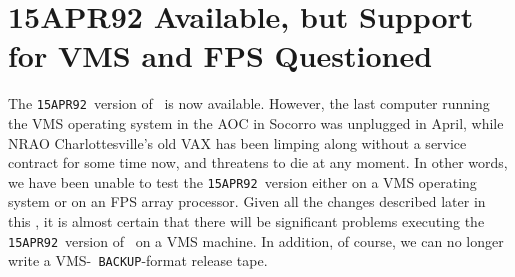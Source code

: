 

\newcommand{\AIPRELEASE}{April 15, 1992}
\newcommand{\AIPVOLUME}{Volume X}
\newcommand{\AIPNUMBER}{Number 1}
\newcommand{\RELEASENAME}{{\tt 15APR92}}



\newcommand{\MYSpace}{-11pt}

\normalstyle
\section{15APR92 Available, but Support for VMS and FPS Questioned}
The \RELEASENAME\ version of \AIPS\ is now available.  However, the
last computer running the VMS operating system in the AOC in Socorro
was unplugged in April, while  NRAO Charlottesville's old VAX has been
limping along without a service contract for some time now, and
threatens to die at any moment.  In other words, we have been unable
to test the \RELEASENAME\ version either on a VMS operating system or
on an FPS array processor.  Given all the changes described later in
this \Aipsletter, it is almost certain that there will be significant
problems executing the \RELEASENAME\ version of \AIPS\ on a VMS
machine.  In addition, of course, we can no longer write a VMS-{\tt
BACKUP}-format release tape.

